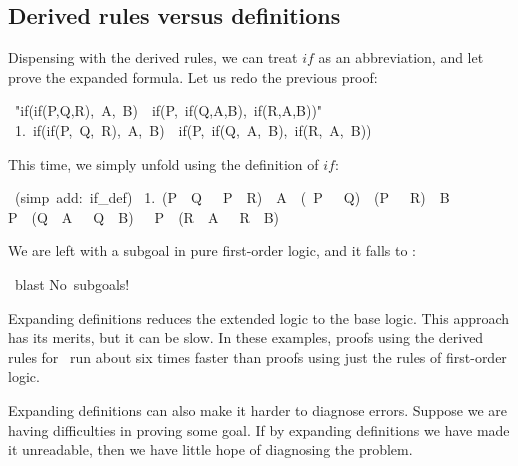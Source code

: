\subsection{Derived rules versus definitions}
Dispensing with the derived rules, we can treat $if$ as an
abbreviation, and let  prove the expanded formula.  Let
us redo the previous proof:
\begin{isabelle}
\ "if(if(P,Q,R),\ A,\ B)\ <->\ if(P,\ if(Q,A,B),\ if(R,A,B))"\isanewline
\ 1.\ if(if(P,\ Q,\ R),\ A,\ B)\ \isasymlongleftrightarrow \ if(P,\ if(Q,\ A,\ B),\ if(R,\ A,\ B))
\end{isabelle}
This time, we simply unfold using the definition of $if$:
\begin{isabelle}
\ (simp\ add:\ if\_def)\isanewline
\ 1.\ (P\ \isasymand \ Q\ \isasymor \ \isasymnot \ P\ \isasymand \ R)\ \isasymand \ A\ \isasymor \ (\isasymnot \ P\ \isasymor \ \isasymnot \ Q)\ \isasymand \ (P\ \isasymor \ \isasymnot \ R)\ \isasymand \ B\ \isasymlongleftrightarrow \isanewline
{}P\ \isasymand \ (Q\ \isasymand \ A\ \isasymor \ \isasymnot \ Q\ \isasymand \ B)\ \isasymor \ \isasymnot \ P\ \isasymand \ (R\ \isasymand \ A\ \isasymor \ \isasymnot \ R\ \isasymand \ B)
\end{isabelle}
We are left with a subgoal in pure first-order logic, and it falls to
:
\begin{isabelle}
\ blast\isanewline
No\ subgoals!
\end{isabelle}
Expanding definitions reduces the extended logic to the base logic.  This
approach has its merits, but it can be slow.  In these examples, proofs
using the derived rules for~ run about six
times faster  than proofs using just the rules of first-order logic.

Expanding definitions can also make it harder to diagnose errors. 
Suppose we are having difficulties in proving some goal.  If by expanding
definitions we have made it unreadable, then we have little hope of
diagnosing the problem.

